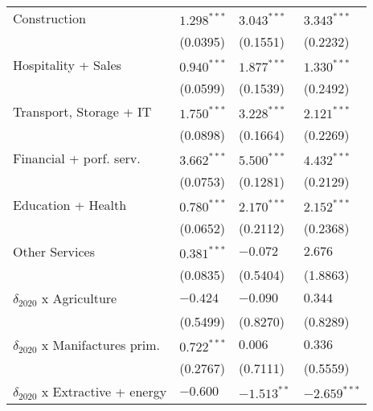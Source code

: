 \begin{tabular}{llll}
Construction                                       &      $1.298^{***}$ &      $3.043^{***}$ &      $3.343^{***}$ \\
                                                   &           (0.0395) &           (0.1551) &           (0.2232) \\
Hospitality + Sales                                &      $0.940^{***}$ &      $1.877^{***}$ &      $1.330^{***}$ \\
                                                   &           (0.0599) &           (0.1539) &           (0.2492) \\
Transport, Storage + IT                            &      $1.750^{***}$ &      $3.228^{***}$ &      $2.121^{***}$ \\
                                                   &           (0.0898) &           (0.1664) &           (0.2269) \\
Financial + porf. serv.                            &      $3.662^{***}$ &      $5.500^{***}$ &      $4.432^{***}$ \\
                                                   &           (0.0753) &           (0.1281) &           (0.2129) \\
Education + Health                                 &      $0.780^{***}$ &      $2.170^{***}$ &      $2.152^{***}$ \\
                                                   &           (0.0652) &           (0.2112) &           (0.2368) \\
Other Services                                     &      $0.381^{***}$ &           $-0.072$ &            $2.676$ \\
                                                   &           (0.0835) &           (0.5404) &           (1.8863) \\
$\delta_{2020}$ x Agriculture                      &           $-0.424$ &           $-0.090$ &            $0.344$ \\
                                                   &           (0.5499) &           (0.8270) &           (0.8289) \\
$\delta_{2020}$ x Manifactures prim.               &      $0.722^{***}$ &            $0.006$ &            $0.336$ \\
                                                   &           (0.2767) &           (0.7111) &           (0.5559) \\
$\delta_{2020}$ x Extractive + energy              &           $-0.600$ &      $-1.513^{**}$ &     $-2.659^{***}$ \\

\end{tabular}
